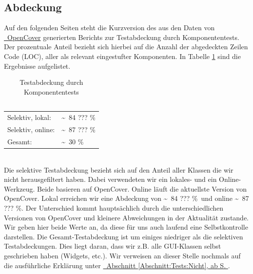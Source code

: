 %



\subsection{Abdeckung}
\label{Abschnitt:Tests:Statistik:Abdeckung}

\newcommand\VSLocalCoverage{\textasciitilde~84 ??? \%}

\newcommand\OnlineLocalCoverage{\textasciitilde~87 ??? \%}

\newcommand\VSGlobalCoverage{\textasciitilde~30 \%}

Auf den folgenden Seiten steht die Kurzversion des aus den Daten von \hyperref[Abschnitt:Tests:Werkzeuge:Automatisiert:OpenCover]{\mousecursor~OpenCover} generierten Berichts zur Testabdeckung durch Komponententests.
Der prozentuale Anteil bezieht sich hierbei auf die Anzahl der abgedeckten Zeilen Code (LOC), aller als relevant eingestufter Komponenten. In Tabelle \ref{Abschnitt:Tests:Statistik:Abdeckung:Tabelle} sind die Ergebnisse aufgelistet.

\begin{longtable}{p{0.5\hsize}p{0.5\hsize}}

	\caption{Testabdeckung durch Komponententests\\~\\}
	\label{Abschnitt:Tests:Statistik:Abdeckung:Tabelle}
	\\

	  Selektiv, lokal:
	& \VSLocalCoverage \\
	
	  Selektiv, online:
	& \OnlineLocalCoverage \\
	
	  Gesamt:
	& \VSGlobalCoverage \\

\end{longtable}

~\\

Die selektive Testabdeckung bezieht sich auf den Anteil aller Klassen die wir nicht herausgefiltert haben. Dabei verwendeten wir ein lokales- und ein Online-Werkzeug. Beide basieren auf OpenCover. Online läuft die aktuellste Version von OpenCover. Lokal erreichen wir eine Abdeckung von \VSLocalCoverage~und online \OnlineLocalCoverage. Der Unterschied kommt hauptsächlich durch die unterschiedlichen Versionen von OpenCover und kleinere Abweichungen in der Aktualität zustande. Wir geben hier beide Werte an, da diese für uns auch laufend eine Selbstkontrolle darstellen. Die Gesamt-Testabdeckung ist um einiges niedriger als die selektiven Testabdeckungen. Dies liegt daran, dass wir z.B. alle GUI-Klassen selbst geschrieben haben (Widgets, etc.). Wir verweisen an dieser Stelle nochmals auf die ausführliche Erklärung unter \hyperref[Abschnitt:Tests:Nicht]{\mousecursor~Abschnitt \ref{Abschnitt:Tests:Nicht}, ab S. \pageref{Abschnitt:Tests:Nicht}}.


